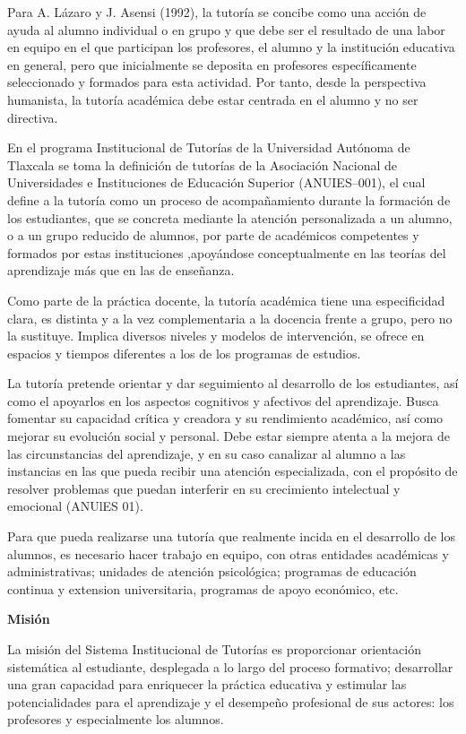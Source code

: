 Para A. Lázaro y J. Asensi (1992), la tutoría se concibe como una acción de ayuda al alumno individual o en grupo y que debe ser el resultado de una labor en equipo en el que participan los profesores, el alumno y la institución educativa en general, pero que inicialmente se deposita en profesores específicamente seleccionado y formados para esta actividad. Por tanto, desde la perspectiva humanista, la tutoría académica debe estar centrada en el alumno y no ser directiva.

En el programa Institucional de Tutorías de la Universidad Autónoma de Tlaxcala se toma la definición de tutorías de la Asociación Nacional de Universidades e Instituciones de Educación Superior (ANUIES--001), el cual define a la tutoría como un proceso de acompañamiento durante la formación de los estudiantes, que se concreta mediante la atención personalizada a un alumno, o a un grupo reducido de  alumnos,  por parte de académicos competentes y formados  por  estas instituciones ,apoyándose conceptualmente en las teorías del aprendizaje más que en las de enseñanza.

Como parte de la práctica docente, la tutoría académica tiene una especificidad clara, es distinta y a la vez complementaria a la docencia frente a grupo, pero no la sustituye. Implica diversos niveles y modelos de intervención, se ofrece en espacios y tiempos diferentes a los de los programas de estudios.

La tutoría pretende orientar y dar seguimiento al desarrollo de los estudiantes, así como el apoyarlos en los aspectos cognitivos y afectivos del aprendizaje. Busca fomentar su capacidad crítica y creadora y su rendimiento académico, así como mejorar su evolución social y personal. Debe estar siempre atenta a la mejora de las  circunstancias  del  aprendizaje,  y  en  su  caso canalizar  al  alumno  a  las instancias en las que pueda recibir una atención especializada, con el propósito de resolver problemas que puedan interferir en su crecimiento intelectual y emocional (ANUlES 01).

Para que pueda realizarse una tutoría que realmente incida en el desarrollo de los alumnos, es necesario hacer trabajo en equipo, con otras entidades académicas y administrativas; unidades de atención psicológica; programas de educación continua y extension universitaria, programas de apoyo económico, etc\@.

\bigskip
\textbf{Misión}

La misión  del Sistema  Institucional  de Tutorías  es proporcionar  orientación   sistemática al estudiante,   desplegada   a lo largo  del  proceso  formativo;   desarrollar   una  gran capacidad   para  enriquecer   la práctica  educativa  y estimular   las  potencialidades para el aprendizaje   y el desempeño   profesional  de sus  actores:  los profesores   y especialmente   los alumnos.


